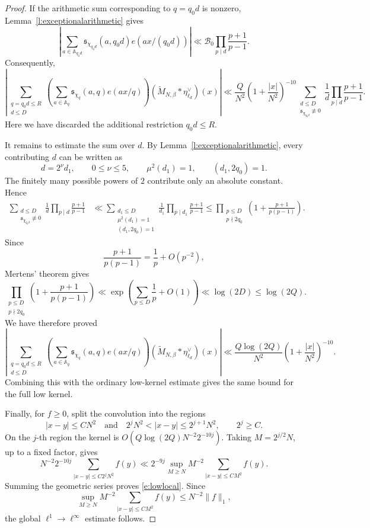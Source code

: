 \documentclass[12pt,reqno]{amsart}
\numberwithin{equation}{section}
\theoremstyle{definition}
\theoremstyle{remark}
\begin{document}
\begin{proof}
If the arithmetic sum corresponding to \(q=q_0d\) is nonzero,
Lemma~\ref{l:exceptionalarithmetic} gives
\[
 \left|
 \sum_{a\in\mathbb A_{q_0d}}
 \mathfrak s_{\chi_{q_0d}}(a,q_0d)e(ax/(q_0d))
 \right|
 \ll
 \mathcal B_0\prod_{p\mid d}\frac{p+1}{p-1}.
\]
Consequently,
\[
 |\sum_{\substack{q=q_0d\leq R\\d\leq D}}
 \left(
 \sum_{a\in\mathbb A_q}
 \mathfrak s_{\chi_q}(a,q)e(ax/q)
 \right)
 (\widetilde M_{N,\beta}*\eta_{\ell_d}^{\vee})(x)|
 \ll
 \frac{Q}{N^2}
 \left(1+\frac{|x|}{N^2}\right)^{-10}
 \sum_{\substack{d\leq D\\
       \mathfrak s_{\chi_{q_0d}}\not\equiv0}}
 \frac1d\prod_{p\mid d}\frac{p+1}{p-1}.
\]
Here we have discarded the additional restriction \(q_0d\leq R\).

It remains to estimate the sum over \(d\).  By
Lemma~\ref{l:exceptionalarithmetic}, every contributing \(d\) can be
written as
\[
 d=2^\nu d_1,\qquad
 0\leq\nu\leq5,\qquad
 \mu^2(d_1)=1,\qquad
 (d_1,2q_0)=1.
\]
The finitely many possible powers of \(2\) contribute only an absolute
constant.  Hence
\begin{align*}
 \sum_{\substack{d\leq D\\
       \mathfrak s_{\chi_{q_0d}}\not\equiv0}}
 \frac1d\prod_{p\mid d}\frac{p+1}{p-1}
 &\ll
 \sum_{\substack{d_1\leq D\\
       \mu^2(d_1)=1\\(d_1,2q_0)=1}}
 \frac1{d_1}\prod_{p\mid d_1}\frac{p+1}{p-1}\leq
 \prod_{\substack{p\leq D\\p\nmid2q_0}}
 \left(1+\frac{p+1}{p(p-1)}\right).
\end{align*}
Since
\[
 \frac{p+1}{p(p-1)}=\frac1p+O(p^{-2}),
\]
Mertens' theorem gives
\[
 \prod_{\substack{p\leq D\\p\nmid2q_0}}
 \left(1+\frac{p+1}{p(p-1)}\right)
 \ll
 \exp\left(\sum_{p\leq D}\frac1p+O(1)\right)
 \ll\log(2D)\leq\log(2Q).
\]
We have therefore proved
\[
 |\sum_{\substack{q=q_0d\leq R\\d\leq D}}
 \left(
 \sum_{a\in\mathbb A_q}
 \mathfrak s_{\chi_q}(a,q)e(ax/q)
 \right)
 (\widetilde M_{N,\beta}*\eta_{\ell_d}^{\vee})(x)|
 \ll
 \frac{Q\log(2Q)}{N^2}
 \left(1+\frac{|x|}{N^2}\right)^{-10}.
\]
Combining this with the ordinary low-kernel estimate gives the same
bound for the full low kernel.

Finally, for \(f\geq0\), split the convolution into the regions
\[
 |x-y|\leq CN^2
 \quad\text{and}\quad
 2^jN^2<|x-y|\leq2^{j+1}N^2,\qquad 2^j\geq C.
\]
On the \(j\)-th region the kernel is
\(O(Q\log(2Q)N^{-2}2^{-10j})\).  Taking
\(M=2^{j/2}N\), up to a fixed factor, gives
\[
 N^{-2}2^{-10j}
 \sum_{|x-y|\leq C2^jN^2}f(y)
 \ll
 2^{-9j}
 \sup_{M\geq N}M^{-2}
 \sum_{|x-y|\leq CM^2}f(y).
\]
Summing the geometric series proves \eqref{e:lowlocal}.  Since
\[
 \sup_{M\geq N}M^{-2}
 \sum_{|x-y|\leq CM^2}f(y)
 \leq N^{-2}\|f\|_1,
\]
the global \(\ell^1\to\ell^\infty\) estimate follows.
\end{proof}
\end{document}
